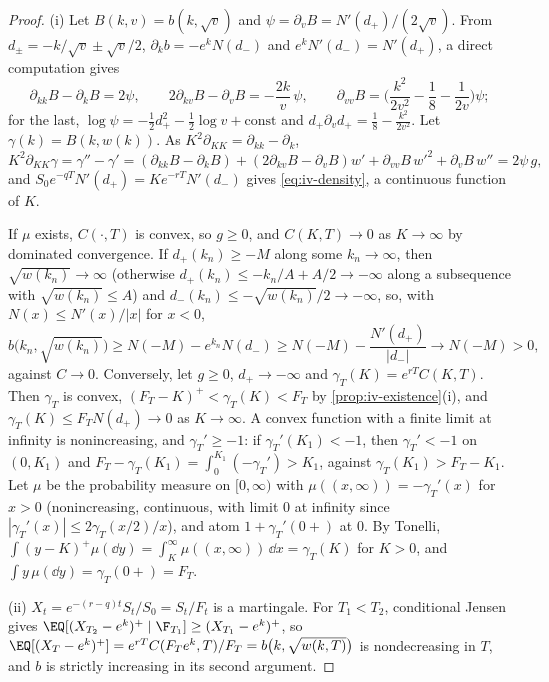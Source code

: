 \begin{proof}
(i) Let $B(k,v)=b(k,\sqrt v)$ and $\psi=\partial_vB=N'(d_+)/(2\sqrt v)$. From $d_\pm=-k/\sqrt v\pm\sqrt v/2$,
$\partial_kb=-e^kN(d_-)$ and $e^kN'(d_-)=N'(d_+)$, a direct computation gives
\[
  \partial_{kk}B-\partial_kB=2\psi,\qquad 2\partial_{kv}B-\partial_vB=-\frac{2k}{v}\,\psi,\qquad
  \partial_{vv}B=\Big(\frac{k^2}{2v^2}-\frac18-\frac1{2v}\Big)\psi ;
\]
for the last, $\log\psi=-\frac12d_+^2-\frac12\log v+\mathrm{const}$ and $d_+\partial_vd_+=\frac18-\frac{k^2}{2v^2}$.
Let $\gamma(k)=B(k,w(k))$. As $K^2\partial_{KK}=\partial_{kk}-\partial_k$,
\[
  K^2\partial_{KK}\gamma=\gamma''-\gamma'
  =(\partial_{kk}B-\partial_kB)+(2\partial_{kv}B-\partial_vB)w'+\partial_{vv}B\,w'^2+\partial_vB\,w''
  =2\psi\,g ,
\]
and $S_0e^{-qT}N'(d_+)=Ke^{-rT}N'(d_-)$ gives \eqref{eq:iv-density}, a continuous function of $K$.

If $\mu$ exists, $C(\cdot,T)$ is convex, so $g\ge0$, and $C(K,T)\to0$ as $K\to\infty$ by dominated
convergence. If $d_+(k_n)\ge-M$ along some $k_n\to\infty$, then $\sqrt{w(k_n)}\to\infty$ (otherwise
$d_+(k_n)\le-k_n/A+A/2\to-\infty$ along a subsequence with $\sqrt{w(k_n)}\le A$) and
$d_-(k_n)\le-\sqrt{w(k_n)}/2\to-\infty$, so, with $N(x)\le N'(x)/|x|$ for $x<0$,
\[
  b\big(k_n,\sqrt{w(k_n)}\big)\ge N(-M)-e^{k_n}N(d_-)\ge N(-M)-\frac{N'(d_+)}{|d_-|}\longrightarrow N(-M)>0,
\]
against $C\to0$. Conversely, let $g\ge0$, $d_+\to-\infty$ and $\gamma_T(K)=e^{rT}C(K,T)$. Then
$\gamma_T$ is convex, $(F_T-K)^+<\gamma_T(K)<F_T$ by \cref{prop:iv-existence}(i), and
$\gamma_T(K)\le F_TN(d_+)\to0$ as $K\to\infty$. A convex function with a finite limit at infinity is
nonincreasing, and $\gamma_T'\ge-1$: if $\gamma_T'(K_1)<-1$, then $\gamma_T'<-1$ on $(0,K_1)$ and
$F_T-\gamma_T(K_1)=\int_0^{K_1}(-\gamma_T')>K_1$, against $\gamma_T(K_1)>F_T-K_1$. Let $\mu$ be the
probability measure on $[0,\infty)$ with $\mu((x,\infty))=-\gamma_T'(x)$ for $x>0$ (nonincreasing,
continuous, with limit $0$ at infinity since $|\gamma_T'(x)|\le2\gamma_T(x/2)/x$), and atom
$1+\gamma_T'(0+)$ at $0$. By Tonelli, $\int(y-K)^+\mu(\dd y)=\int_K^\infty\mu((x,\infty))\,\dd x=\gamma_T(K)$
for $K>0$, and $\int y\,\mu(\dd y)=\gamma_T(0+)=F_T$.

(ii) $X_t=e^{-(r-q)t}S_t/S_0=S_t/F_t$ is a martingale. For $T_1<T_2$, conditional Jensen gives
$\EQ[(X_{T_2}-e^k)^+\mid\F_{T_1}]\ge(X_{T_1}-e^k)^+$, so $\EQ[(X_T-e^k)^+]=e^{rT}C(F_Te^k,T)/F_T
=b\big(k,\sqrt{w(k,T)}\big)$ is nondecreasing in $T$, and $b$ is strictly increasing in its second
argument.
\end{proof}

